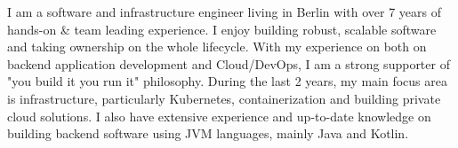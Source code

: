 
\begin{cvparagraph}

    I am a software and infrastructure engineer living in Berlin
    with over 7 years of hands-on \& team leading experience.
    \newline
    I enjoy building robust, scalable software and taking ownership on the whole lifecycle.
    \newline
    With my experience on both on backend application development and Cloud/DevOps,
    I am a strong supporter of "you build it you run it" philosophy.
    \newline
    During the last 2 years, my main focus area is infrastructure, particularly Kubernetes,
    containerization and building private cloud solutions.
    \newline
    I also have extensive experience and up-to-date knowledge on building backend software
    using JVM languages, mainly Java and Kotlin.

\end{cvparagraph}
